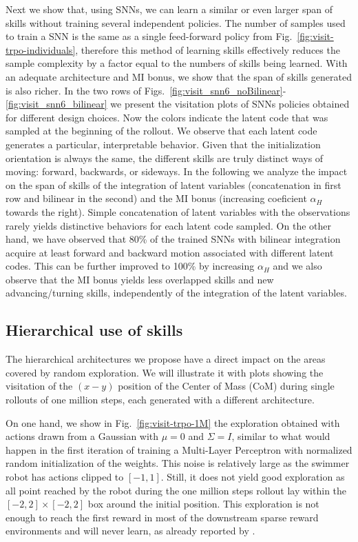 \documentclass{article} %
\begin{document}
Next we show that, using SNNs, we can learn a similar or even larger span of skills without training several independent policies. The number of samples used to train a SNN is the same as a single feed-forward policy from Fig.\ \ref{fig:visit-trpo-individuals}, therefore this method of learning skills effectively reduces the sample complexity by a factor equal to the numbers of skills being learned. With an adequate architecture and MI bonus, we show that the span of skills generated is also richer.   
In the two rows of Figs.\ \ref{fig:visit_snn6_noBilinear}-\ref{fig:visit_snn6_bilinear} we present the visitation plots of SNNs policies obtained for different design choices. Now the colors indicate the latent code that was sampled at the beginning of the rollout. We observe that each latent code generates a particular, interpretable behavior. Given that the initialization orientation is always the same, the different skills are truly distinct ways of moving: forward, backwards, or sideways. In the following we analyze the impact on the span of skills of the integration of latent variables (concatenation in first row and bilinear in the second) and the MI bonus (increasing coeficient $\alpha_H$ towards the right). Simple concatenation of latent variables with the observations rarely yields distinctive behaviors for each latent code sampled. On the other hand, we have observed that 80\% of the trained SNNs with bilinear integration acquire at least forward and backward motion associated with different latent codes. This can be further improved to 100\% by increasing $\alpha_H$ and we also observe that the MI bonus yields less overlapped skills and new advancing/turning skills, independently of the integration of the latent variables.


\subsection{Hierarchical use of skills}

The hierarchical architectures we propose have a direct impact on the areas covered by random exploration. We will illustrate it with plots showing the visitation of the $(x-y)$ position of the Center of Mass (CoM) during single rollouts of one million steps, each generated with a different architecture. 

On one hand, we show in Fig.\ \ref{fig:visit-trpo-1M} the exploration obtained with actions drawn from a Gaussian with $\mu=0$ and $\Sigma=I$, similar to what would happen in the first iteration of training a Multi-Layer Perceptron with normalized random initialization of the weights. This noise is relatively large as the swimmer robot has actions clipped to $[-1,1]$. Still, it does not yield good exploration as all point reached by the robot during the one million steps rollout lay within the $[-2,2]\times[-2,2]$ box around the initial position. This exploration is not enough to reach the first reward in most of the downstream sparse reward environments and will never learn, as already reported by \citet{duan2016benchmarking}. 
\end{document}
